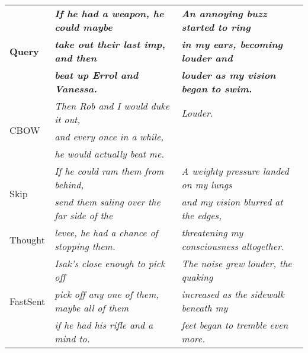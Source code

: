 \begin{table*}[ht]
\begin{adjustwidth}{-0.1cm}{}
\renewcommand{\tabcolsep}{4.6pt}
\footnotesize
  \begin{center}
      {
        \begin{tabular}{l|l|l}
           \multirow{3}{*}{\bf \small Query} &  \bf \emph{If he had a weapon, he could maybe} & \bf \emph{An annoying buzz started to ring }  \\
           &  \bf \emph{take out their last imp, and then} & \bf \emph{in my ears, becoming louder and}  \\
           &\bf \emph{beat up Errol and Vanessa.} & \bf  \emph{louder as my vision began to swim. } \\
\hline
\hline
           \multirow{3}{*}{\small CBOW} &  \emph{Then Rob and I would duke it out,} &  \emph{Louder.}  \\
            &  \emph{and every once in a while,} & \\
           &\emph{he would actually beat me.} & 
\\
\hline
           \multirow{2}{*}{\small  Skip} &  \emph{If he could ram them from behind,} &  \emph{A weighty pressure landed on my lungs} \\
             &\emph{send them saling over the far side of the} &  \emph{and my vision blurred at the edges,} \\
           \small Thought&\emph{levee, he had a chance of stopping them.} &  \emph{threatening my consciousness altogether.}
\\
\hline
           \multirow{3}{*}{\small  FastSent} &  \emph{Isak's close enough to pick off } &  \emph{The noise grew louder, the quaking} \\
           &  \emph{pick off any one of them, maybe all of them} &  \emph{increased as the sidewalk beneath my} \\
           &\emph{if he had his rifle and a mind to. } &  \emph{ feet began to tremble even more.}
\\
\hline


\end{tabular}}
\end{center}
\end{adjustwidth}
\end{table*}
